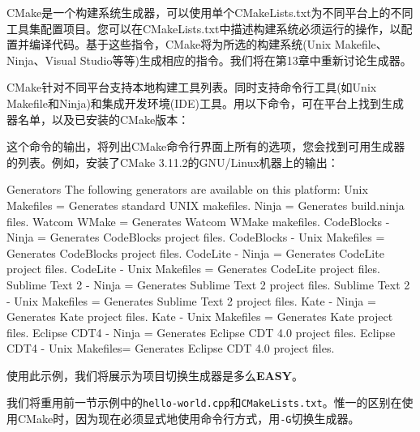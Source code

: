 CMake是一个构建系统生成器，可以使用单个CMakeLists.txt为不同平台上的不同工具集配置项目。您可以在CMakeLists.txt中描述构建系统必须运行的操作，以配置并编译代码。基于这些指令，CMake将为所选的构建系统(Unix Makefile、Ninja、Visual Studio等等)生成相应的指令。我们将在第13章中重新讨论生成器。


CMake针对不同平台支持本地构建工具列表。同时支持命令行工具(如Unix Makefile和Ninja)和集成开发环境(IDE)工具。用以下命令，可在平台上找到生成器名单，以及已安装的CMake版本：


这个命令的输出，将列出CMake命令行界面上所有的选项，您会找到可用生成器的列表。例如，安装了CMake 3.11.2的GNU/Linux机器上的输出：

\begin{codebox}[shell]
Generators
The following generators are available on this platform:
Unix Makefiles = Generates standard UNIX makefiles.
Ninja = Generates build.ninja files.
Watcom WMake = Generates Watcom WMake makefiles.
CodeBlocks - Ninja = Generates CodeBlocks project files.
CodeBlocks - Unix Makefiles = Generates CodeBlocks project files.
CodeLite - Ninja = Generates CodeLite project files.
CodeLite - Unix Makefiles = Generates CodeLite project files.
Sublime Text 2 - Ninja = Generates Sublime Text 2 project files.
Sublime Text 2 - Unix Makefiles = Generates Sublime Text 2 project files.
Kate - Ninja = Generates Kate project files.
Kate - Unix Makefiles = Generates Kate project files.
Eclipse CDT4 - Ninja = Generates Eclipse CDT 4.0 project files.
Eclipse CDT4 - Unix Makefiles= Generates Eclipse CDT 4.0 project files.
\end{codebox}

使用此示例，我们将展示为项目切换生成器是多么\textbf{EASY}。


我们将重用前一节示例中的\texttt{hello-world.cpp}和\texttt{CMakeLists.txt}。惟一的区别在使用CMake时，因为现在必须显式地使用命令行方式，用\texttt{-G}切换生成器。

